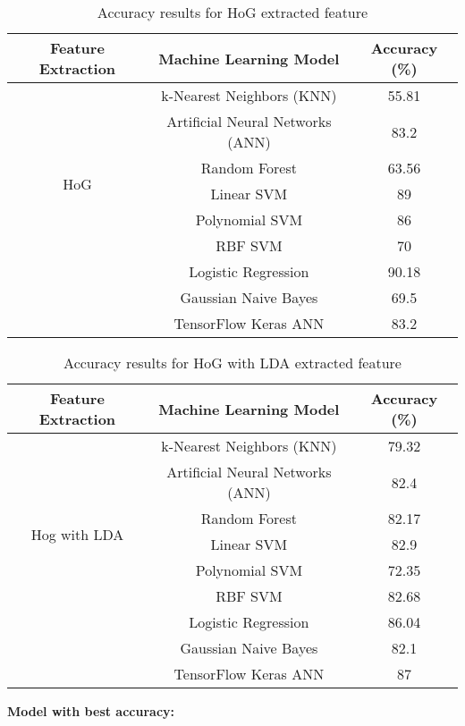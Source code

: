 \documentclass[a4paper]{article}
\theoremstyle{plain}
\theoremstyle{definition}
\begin{document}
\begin{table}[htbp]
\centering
\Large
\caption{Accuracy results for HoG extracted feature}
\label{tab:results}
\begin{tabular}{|c|c|c|}
\hline
\textbf{Feature Extraction} & \textbf{Machine Learning Model} & \textbf{Accuracy (\%)} \\ \hline
\multirow{7}{*}{HoG} & k-Nearest Neighbors (KNN) & 55.81 \\ \cline{2-3} 
 & Artificial Neural Networks (ANN) & 83.2 \\ \cline{2-3} 
 & Random Forest & 63.56 \\ \cline{2-3} 
 &  Linear SVM & 89 \\ \cline{2-3} 
 & Polynomial SVM & 86 \\ \cline{2-3} 
 & RBF SVM & 70 \\ \cline{2-3} 
 & Logistic Regression & 90.18 \\ \cline{2-3} 
 & Gaussian Naive Bayes & 69.5 \\ \cline{2-3}  
 & TensorFlow Keras ANN & 83.2 \\ \hline
\end{tabular}
\end{table}







\clearpage

\begin{table}[htbp]
\centering
\Large
\caption{Accuracy results for HoG with LDA extracted feature}
\label{tab:results}
\begin{tabular}{|c|c|c|}
\hline
\textbf{Feature Extraction} & \textbf{Machine Learning Model} & \textbf{Accuracy (\%)} \\ \hline
\multirow{7}{*}{Hog with LDA } & k-Nearest Neighbors (KNN) & 79.32 \\ \cline{2-3} 
 & Artificial Neural Networks (ANN) & 82.4 \\ \cline{2-3} 
 & Random Forest & 82.17 \\ \cline{2-3} 
 &  Linear SVM & 82.9 \\ \cline{2-3} 
 & Polynomial SVM & 72.35 \\ \cline{2-3} 
 & RBF SVM & 82.68 \\ \cline{2-3} 
 & Logistic Regression & 86.04 \\ \cline{2-3} 
 & Gaussian Naive Bayes & 82.1 \\ \cline{2-3}  
 & TensorFlow Keras ANN & 87 \\ \hline
\end{tabular}
\end{table}
\textbf{Model with best accuracy:}
\end{document}
